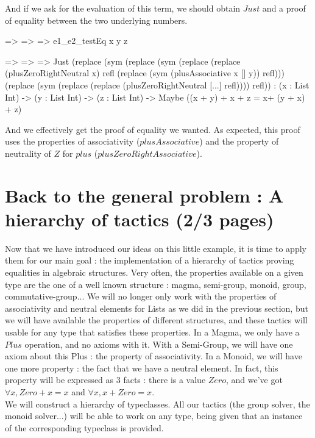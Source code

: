 \documentclass{sigplanconf}
\begin{document}
And if we ask for the evaluation of this term, we should obtain $Just$ and a proof of equality between the two underlying numbers.
\begin{code}[caption=Evaluation of the result, captionpos=b, label=lst1:haskell2]
\x => \y => \z => e1_e2_testEq x y z

\x => \y => \z => Just (replace (sym (replace 
(sym (replace (replace (plusZeroRightNeutral x)
 refl (replace (sym (plusAssociative x [] y)) 
 refl))) (replace (sym (replace (replace 
 (plusZeroRightNeutral [...] refl)))) refl)) 
: (x : List Int) -> (y : List Int) -> 
  (z : List Int) -> 
  Maybe ((x + y) + x + z 
         = x+ (y + x) + z)
\end{code}

And we effectively get the proof of equality we wanted. As expected, this proof uses the properties of associativity ($plusAssociative$) and the property of neutrality of $Z$ for $plus$ ($plusZeroRightAssociative$).

\section {Back to the general problem : A hierarchy of tactics (2/3 pages)}

Now that we have introduced our ideas on this little example, it is time to apply them for our main goal : the implementation of a hierarchy of tactics proving equalities in algebraic structures. Very often, the properties available on a given type are the one of a well known structure : magma, semi-group, monoid, group, commutative-group...  We will no longer only work with the properties of associativity and neutral elements for Lists as we did in the previous section, but we will have available the properties of different structures, and these tactics will usable for any type that satisfies these properties.
In a Magma, we only have a $Plus$ operation, and no axioms with it. With a Semi-Group, we will have one axiom about this Plus : the property of associativity. In a Monoid, we will have one more property : the fact that we have a neutral element. In fact, this property will be expressed as 3 facts : there is a value $Zero$, and we've got $\forall x, Zero + x = x$ and $\forall x, x + Zero = x$. \\

We will construct a hierarchy of typeclasses. All our tactics (the group solver, the monoid solver...) will be able to work on any type, being given that an instance of the corresponding typeclass is provided.
\end{document}
